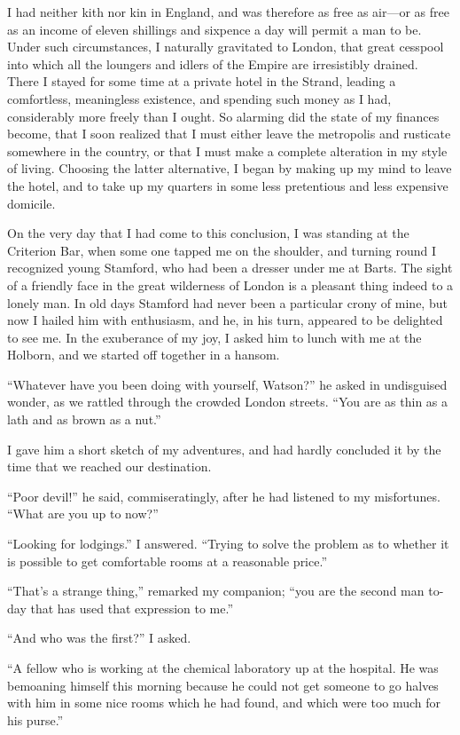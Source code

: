 \documentclass[12pt,english,oneside]{book}
\newcommand{\mdsh}[1]{\mbox{#1}\linebreak[1]}
\begin{document}
I had neither kith nor kin in England, and was therefore as free as
air\mdsh{---}or as free as an income of eleven shillings and sixpence
a day will permit a man to be. Under such circumstances, I naturally
gravitated to London, that great cesspool into which all the loungers
and idlers of the Empire are irresistibly drained. There I stayed
for some time at a private hotel in the Strand, leading a comfortless,
meaningless existence, and spending such money as I had, considerably
more freely than I ought. So alarming did the state of my finances
become, that I soon realized that I must either leave the metropolis
and rusticate somewhere in the country, or that I must make a complete
alteration in my style of living. Choosing the latter alternative,
I began by making up my mind to leave the hotel, and to take up my
quarters in some less pretentious and less expensive domicile.

On the very day that I had come to this conclusion, I was standing
at the Criterion Bar, when some one tapped me on the shoulder, and
turning round I recognized young Stamford, who had been a dresser
under me at Barts. The sight of a friendly face in the great wilderness
of London is a pleasant thing indeed to a lonely man. In old days
Stamford had never been a particular crony of mine, but now I hailed
him with enthusiasm, and he, in his turn, appeared to be delighted
to see me. In the exuberance of my joy, I asked him to lunch with
me at the Holborn, and we started off together in a hansom.

{}``Whatever have you been doing with yourself, Watson?'' he asked
in undisguised wonder, as we rattled through the crowded London streets.
{}``You are as thin as a lath and as brown as a nut.''

I gave him a short sketch of my adventures, and had hardly concluded
it by the time that we reached our destination.

{}``Poor devil!'' he said, commiseratingly, after he had listened
to my misfortunes. {}``What are you up to now?''

{}``Looking for lodgings.'' I answered. {}``Trying to solve the
problem as to whether it is possible to get comfortable rooms at a
reasonable price.''

{}``That's a strange thing,'' remarked my companion; {}``you are
the second man to-day that has used that expression to me.''

{}``And who was the first?'' I asked.

{}``A fellow who is working at the chemical laboratory up at the
hospital. He was bemoaning himself this morning because he could not
get someone to go halves with him in some nice rooms which he had
found, and which were too much for his purse.''
\end{document}
